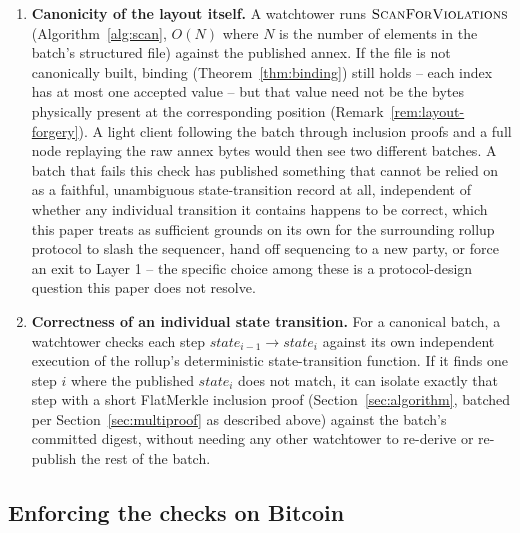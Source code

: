 \begin{enumerate}
\item \textbf{Canonicity of the layout itself.} A watchtower runs
  $\textsc{ScanForViolations}$ (Algorithm~\ref{alg:scan}, $O(N)$ where $N$
  is the number of elements in the batch's structured file) against the
  published annex. If the file is not canonically built, binding
  (Theorem~\ref{thm:binding}) still holds -- each index has at most one
  accepted value -- but that value need not be the bytes physically
  present at the corresponding position (Remark~\ref{rem:layout-forgery}).
  A light client following the batch through inclusion proofs and a full
  node replaying the raw annex bytes would then see two different batches.
  A batch that fails this check has published something that cannot be
  relied on as a
  faithful, unambiguous state-transition record at all, independent of
  whether any individual transition it contains happens to be correct,
  which this paper treats as sufficient grounds on its own for the
  surrounding rollup protocol to slash the sequencer, hand off sequencing
  to a new party, or force an exit to Layer 1 -- the specific choice among
  these is a protocol-design question this paper does not resolve.
\item \textbf{Correctness of an individual state transition.} For a
  canonical batch, a watchtower checks each step $\mathit{state}_{i-1}
  \to \mathit{state}_i$ against its own independent execution of the
  rollup's deterministic state-transition function. If it finds one step
  $i$ where the published $\mathit{state}_i$ does not match, it can isolate
  exactly that step with a short FlatMerkle inclusion proof
  (Section~\ref{sec:algorithm}, batched per Section~\ref{sec:multiproof} as
  described above) against the batch's committed digest, without needing
  any other watchtower to re-derive or re-publish the rest of the batch.
\end{enumerate}

\subsection{Enforcing the checks on Bitcoin}
\label{sec:rollup-enforce}

